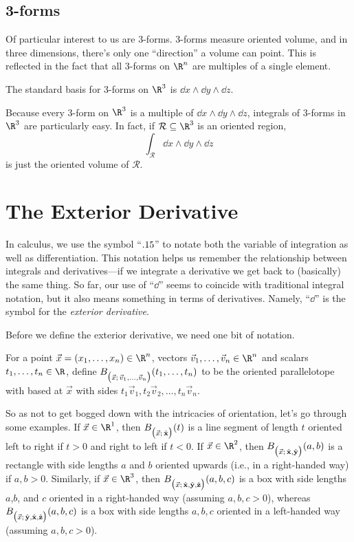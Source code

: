 \subsection{3-forms}

Of particular interest to us are 3-forms.  3-forms measure oriented volume,
and in three dimensions, there's only one ``direction'' a volume can point.
This is reflected in the fact that all 3-forms on $\R^n$ are multiples of
a single element.

\begin{definition}
	The standard basis for 3-forms on $\R^3$ is 
	$\dd x\wedge \dd y\wedge \dd z$.
\end{definition}

Because every 3-form on $\R^3$ is
a multiple of $\dd x\wedge \dd y\wedge \dd z$, integrals of 3-forms in $\R^3$
are particularly easy.  In fact, if $\mathcal R\subseteq \R^3$ is an oriented region,
\[
	\int_{\mathcal R} \dd x\wedge \dd y\wedge \dd z
\]
is just the oriented volume of $\mathcal R$.

\section{The Exterior Derivative}

In calculus, we use the symbol ``$.15$'' to notate both the variable of integration
as well as differentiation.  This notation helps us remember the relationship 
between integrals and derivatives---if we integrate a derivative we get back
to (basically) the same thing.  So far, our use of ``$\dd$'' seems to coincide
with traditional integral notation, but it also means something in terms
of derivatives.  Namely, ``$\dd$'' is the symbol for the \emph{exterior derivative}.

Before we define the exterior derivative, we need one bit of notation.
\begin{definition}
	For a point $\vec x=(x_1,\ldots,x_n)\in \R^n$, vectors
	$\vec v_1,\ldots,\vec v_n\in\R^n$ 
	and scalars $t_1,\ldots, t_n\in \R$, define 
	$B_{\big(\vec x;\, \vec v_1,\ldots, \vec v_n\big)}(t_1,\ldots, t_n)$ 
	to be the oriented parallelotope with based at $\vec x$ with
	sides $t_1\vec v_1, t_2\vec v_2, \ldots, t_n\vec v_n$.
\end{definition}

So as not to get bogged down with the intricacies of orientation, let's go
through some examples.  If $\vec x\in \R^1$, then $B_{\big(\vec x;\, {\hat {\mathbf x}}\big)}(t)$ is a line
segment of length $t$ oriented left to right if $t>0$ and right to left if $t<0$.
If $\vec x\in \R^2$, then $B_{\big(\vec x;\, {\hat {\mathbf x}},{\hat {\mathbf y}}\big)}(a,b)$ 
is a rectangle with side lengths
$a$ and $b$ oriented upwards (i.e., in a right-handed way) if $a,b>0$.  Similarly,
if $\vec x\in\R^3$, then $B_{\big(\vec x;\, {\hat {\mathbf x}},{\hat {\mathbf y}},{\hat {\mathbf z}}\big)}(a,b,c)$ 
is a box with side lengths $a$,$b$,
and $c$ oriented in a right-handed way (assuming $a,b,c>0$), whereas 
$B_{\big(\vec x;\, {\hat {\mathbf y}},{\hat {\mathbf x}},{\hat {\mathbf z}}\big)}(a,b,c)$ is a box with side lengths $a,b,c$
oriented in a left-handed way (assuming $a,b,c>0$).

